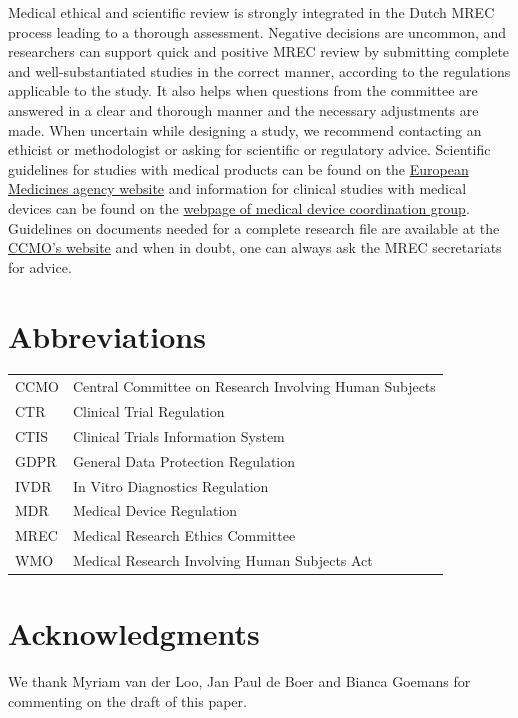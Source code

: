 \documentclass[authordate, meta]{jote-new-article}
\begin{document}
Medical ethical and scientific review is strongly integrated in the Dutch MREC process leading to a thorough assessment. Negative decisions are uncommon, and researchers can support quick and positive MREC review by submitting complete and well-substantiated studies in the correct manner, according to the regulations applicable to the study. It also helps when questions from the committee are answered in a clear and thorough manner and the necessary adjustments are made. When uncertain while designing a study, we recommend contacting an ethicist or methodologist or asking for scientific or regulatory advice. Scientific guidelines for studies with medical products can be found on the \href{https://www.ema.europa.eu/en/human-regulatory/research-development/scientific-guidelines/ich-guidelines}{European Medicines agency website} and information for clinical studies with medical devices can be found on the \href{https://health.ec.europa.eu/medical-devices-dialogue-between-interested-parties/medical-device-coordination-group-working-groups}{webpage of medical device coordination group}. Guidelines on documents needed for a complete research file are available at the \href{https://www.ccmo.nl/}{CCMO's website} and when in doubt, one can always ask the MREC secretariats for advice.




\section{Abbreviations}

\begin{tabularx}{\linewidth}{l X}
  CCMO & Central Committee on Research Involving Human Subjects \\
  CTR  & Clinical Trial Regulation                              \\
  CTIS & Clinical Trials Information System                     \\
  GDPR & General Data Protection Regulation                     \\
  IVDR & In Vitro Diagnostics Regulation                        \\
  MDR  & Medical Device Regulation                              \\
  MREC & Medical Research Ethics Committee                      \\
  WMO  & Medical Research Involving Human Subjects Act
\end{tabularx}









\section{Acknowledgments}



We thank Myriam van der Loo, Jan Paul de Boer and Bianca Goemans for commenting on the draft of this paper.


\printbibliography
\end{document}
